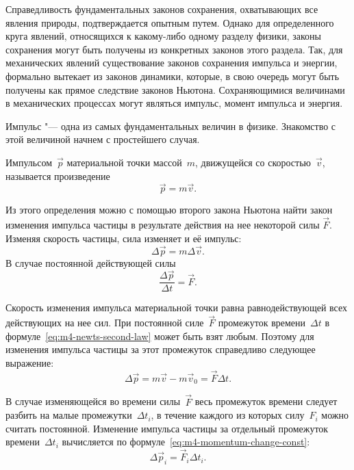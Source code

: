 \documentclass[a4paper, 12pt]{extarticle}
\begin{document}
Справедливость фундаментальных законов сохранения, охватывающих все явления природы, подтверждается опытным путем. Однако для определенного круга явлений, относящихся к какому-либо одному разделу физики, законы сохранения могут быть получены из конкретных законов этого раздела. Так, для механических явлений существование законов сохранения импульса и энергии, формально вытекает из законов динамики, которые, в свою очередь могут быть получены как прямое следствие законов Ньютона. %
Сохраняющимися величинами в механических процессах могут являться импульс, момент импульса и энергия.

Импульс "--- одна из самых фундаментальных величин в физике. Знакомство с этой величиной начнем с простейшего случая.

Импульсом~$\vec p$ материальной точки массой~$m$, движущейся со скоростью~$\vec v$, называется произведение
\begin{equation}
\label{eq:m4-momentum-definition}
\vec p = m \vec v.
\end{equation}

Из этого определения можно с помощью второго закона Ньютона найти закон изменения импульса частицы в результате действия на нее некоторой силы $\vec F$. Изменяя скорость частицы, сила изменяет и её импульс: \[
\Delta \vec p = m \Delta \vec v.
\] %
В случае постоянной действующей силы
\begin{equation}
\label{eq:m4-newts-second-law}
\frac{\Delta \vec p}{\Delta t} = \vec F.
\end{equation}

Скорость изменения импульса материальной точки равна равнодействующей всех действующих на нее сил. При постоянной силе~$\vec F$ промежуток времени~$\Delta t$ в формуле~\eqref{eq:m4-newts-second-law} может быть взят любым. Поэтому для изменения импульса частицы за этот промежуток справедливо
следующее выражение:
\begin{equation}
\label{eq:m4-momentum-change-const}
\Delta \vec p = m \vec v - m \vec v_0 = \vec F \Delta t.
\end{equation}

В случае изменяющейся во времени силы~$\vec F$ весь промежуток времени следует разбить на малые промежутки~$\Delta t_i$, в течение каждого из которых силу~$F_i$ можно считать постоянной. %
Изменение импульса частицы за отдельный промежуток времени~$\Delta t_i$ вычисляется по формуле~\eqref{eq:m4-momentum-change-const}:
\begin{equation}
\label{eq:m4-momentary-momentum-change}
\Delta \vec p_i = \vec F_i \Delta t_i.
\end{equation}
\end{document}
